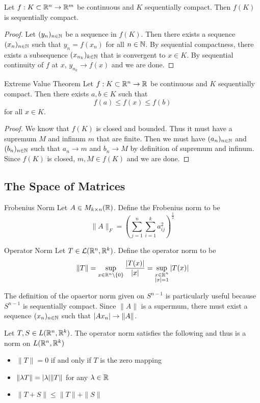 \documentclass[a4paper]{article}
\begin{document}
\begin{thm}{}{} Let $f:K\subset\mathbb{R}^n\to\mathbb{R}^m$ be continuous and $K$ sequentially compact. Then $f(K)$ is sequentially compact. \tcbline
\begin{proof}
Let $(y_n)_{n\in\mathbb{N}}$ be a sequence in $f(K)$. Then there exists a sequence $(x_n)_{n\in\mathbb{N}}$ such that $y_n=f(x_n)$ for all $n\in\mathbb{N}$. By sequential compactness, there exists a subsequence $(x_{n_k})_{k\in\mathbb{N}}$ that is convergent to $x\in K$. By sequential continuity of $f$ at $x$, $y_{n_k}\to f(x)$ and we are done. 
\end{proof}
\end{thm}

\begin{thm}{Extreme Value Theorem}{} Let $f:K\subset\mathbb{R}^n\to\mathbb{R}$ be continuous and $K$ sequentially compact. Then there exists $a,b\in K$ such that $$f(a)\leq f(x)\leq f(b)$$ for all $x\in K$. \tcbline
\begin{proof}
We know that $f(K)$ is closed and bounded. Thus it must have a supremum $M$ and infinum $m$ that are finite. Then we must have $(a_n)_{n\in\mathbb{N}}$ and $(b_n)_{n\in\mathbb{N}}$ such that $a_n\to m$ and $b_n\to M$ by definition of supremum and infinum. Since $f(K)$ is closed, $m,M\in f(K)$ and we are done. 
\end{proof}
\end{thm}

\subsection{The Space of Matrices}
\begin{defn}{Frobenius Norm}{} Let $A\in M_{k\times n}(\mathbb{R})$. Define the Frobenius norm to be $$\|A\|_F=\left(\sum_{j=1}^n\sum_{i=1}^ka_{ij}^2\right)^{\frac{1}{2}}$$
\end{defn}

\begin{defn}{Operator Norm}{} Let $T\in\mathcal{L}(\mathbb{R}^n,\mathbb{R}^k)$. Define the operator norm to be $$\|T\|=\sup_{x\in\mathbb{R}^n\setminus\{0\}}\frac{\abs{T(x)}}{\abs{x}}=\sup_{\substack{x\in\mathbb{R}^n\\\abs{x}=1}}\abs{T(x)}$$
\end{defn}

The definition of the opaertor norm given on $S^{n-1}$ is particularly useful because $S^{n-1}$ is sequentially compact. Since $\|A\|$ is a supermum, there must exist a sequence $(x_n)_{n\in\mathbb{N}}$ such that $\abs{Ax_n}\to\|A\|$. 

\begin{prp}{}{} Let $T,S\in L(\mathbb{R}^n,\mathbb{R}^k)$. The operator norm satisfies the following and thus is a norm on $L(\mathbb{R}^n,\mathbb{R}^k)$
\begin{itemize}
\item $\|T\|=0$ if and only if $T$ is the zero mapping
\item $\|\lambda T\|=\abs{\lambda}\|T\|$ for any $\lambda\in\mathbb{R}$
\item $\|T+S\|\leq\|T\|+\|S\|$
\end{itemize}
\end{prp}
\end{document}
